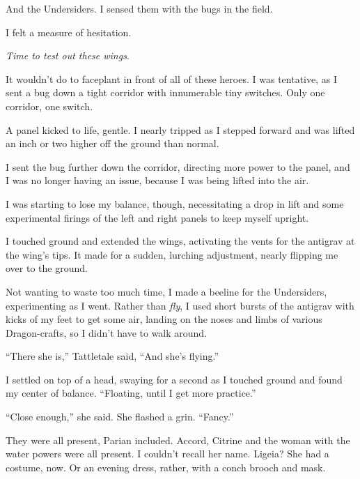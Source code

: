 And the Undersiders.  I sensed them with the bugs in the field.



I felt a measure of hesitation.



\emph{Time to test out these wings}.



It wouldn't do to faceplant in front of all of these heroes.  I was tentative, as I sent a bug down a tight corridor with innumerable tiny switches.  Only one corridor, one switch.



A panel kicked to life, gentle.  I nearly tripped as I stepped forward and was lifted an inch or two higher off the ground than normal.



I sent the bug further down the corridor, directing more power to the panel, and I was no longer having an issue, because I was being lifted into the air.



I was starting to lose my balance, though, necessitating a drop in lift and some experimental firings of the left and right panels to keep myself upright.



I touched ground and extended the wings, activating the vents for the antigrav at the wing's tips.  It made for a sudden, lurching adjustment, nearly flipping me over to the ground.



Not wanting to waste too much time, I made a beeline for the Undersiders, experimenting as I went.  Rather than \emph{fly}, I used short bursts of the antigrav with kicks of my feet to get some air, landing on the noses and limbs of various Dragon-crafts, so I didn't have to walk around.



``There she is,'' Tattletale said, ``And she's flying.''



I settled on top of a head, swaying for a second as I touched ground and found my center of balance.  ``Floating, until I get more practice.''



``Close enough,'' she said.  She flashed a grin.  ``Fancy.''



They were all present, Parian included.  Accord, Citrine and the woman with the water powers were all present.  I couldn't recall her name.  Ligeia?  She had a costume, now.  Or an evening dress, rather, with a conch brooch and mask.



